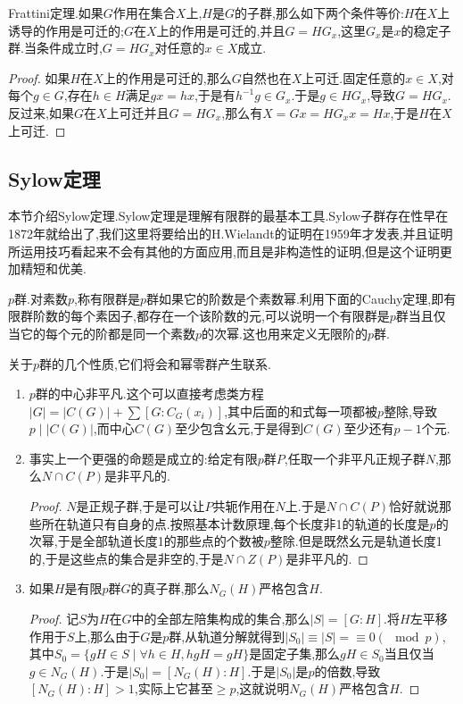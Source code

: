 Frattini定理.如果$G$作用在集合$X$上,$H$是$G$的子群,那么如下两个条件等价:$H$在$X$上诱导的作用是可迁的;$G$在$X$上的作用是可迁的,并且$G=HG_x$,这里$G_x$是$x$的稳定子群.当条件成立时,$G=HG_x$对任意的$x\in X$成立.
\begin{proof}
	
	如果$H$在$X$上的作用是可迁的,那么$G$自然也在$X$上可迁.固定任意的$x\in X$,对每个$g\in G$,存在$h\in H$满足$gx=hx$,于是有$h^{-1}g\in G_x$.于是$g\in HG_x$,导致$G=HG_x$.反过来,如果$G$在$X$上可迁并且$G=HG_x$,那么有$X=Gx=HG_xx=Hx$,于是$H$在$X$上可迁.
	
\end{proof}
\newpage
\subsection{Sylow定理}

本节介绍Sylow定理.Sylow定理是理解有限群的最基本工具.Sylow子群存在性早在1872年就给出了,我们这里将要给出的H.Wielandt的证明在1959年才发表,并且证明所运用技巧看起来不会有其他的方面应用,而且是非构造性的证明,但是这个证明更加精短和优美.

$p$群.对素数$p$,称有限群是$p$群如果它的阶数是个素数幂.利用下面的Cauchy定理,即有限群阶数的每个素因子,都存在一个该阶数的元,可以说明一个有限群是$p$群当且仅当它的每个元的阶都是同一个素数$p$的次幂.这也用来定义无限阶的$p$群.

关于$p$群的几个性质,它们将会和幂零群产生联系.
\begin{enumerate}
	\item $p$群的中心非平凡.这个可以直接考虑类方程$|G|=|C(G)|+\sum[G:C_G(x_i)]$,其中后面的和式每一项都被$p$整除,导致$p\mid|C(G)|$,而中心$C(G)$至少包含幺元,于是得到$C(G)$至少还有$p-1$个元.
	\item 事实上一个更强的命题是成立的:给定有限$p$群$P$,任取一个非平凡正规子群$N$,那么$N\cap C(P)$是非平凡的.
	\begin{proof}
		
		$N$是正规子群,于是可以让$P$共轭作用在$N$上.于是$N\cap C(P)$恰好就说那些所在轨道只有自身的点.按照基本计数原理,每个长度非1的轨道的长度是$p$的次幂,于是全部轨道长度1的那些点的个数被$p$整除.但是既然幺元是轨道长度1的,于是这些点的集合是非空的,于是$N\cap Z(P)$是非平凡的.
	\end{proof}
	\item 如果$H$是有限$p$群$G$的真子群,那么$N_G(H)$严格包含$H$.
	\begin{proof}
		
		记$S$为$H$在$G$中的全部左陪集构成的集合,那么$|S|=[G:H]$.将$H$左平移作用于$S$上,那么由于$G$是$p$群,从轨道分解就得到$|S_0|\equiv|S|=\equiv0(\mod p)$,其中$S_0=\{gH\in S\mid\forall h\in H,hgH=gH\}$是固定子集,那么$gH\in S_0$当且仅当$g\in N_G(H)$.于是$|S_0|=[N_G(H):H]$.于是$|S_0|$是$p$的倍数,导致$[N_G(H):H]>1$,实际上它甚至$\ge p$,这就说明$N_G(H)$严格包含$H$.
		
	\end{proof}
\end{enumerate}

